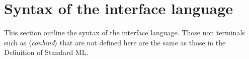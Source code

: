 \documentclass{jbook}
\newif\ifjp
\newcommand{\txt}[2]{#2}
\newcommand{\smlsharp}{SML\#}
\newcommand{\nonterm}[1]{\mbox{$\langle$}{\it #1}\mbox{$\rangle$}}
\begin{document}
\section{\txt{インタフェイス言語の文法}{Syntax of the interface language}}
\label{sec:tutorialInterfaceSyntax}

\ifjp%
	インタフェイス言語の文法の概要を以下に示します．
	\nonterm{conbind}などの定義が無い非終端記号は，The Definition of
Standard MLの同名のものと同一です．
	詳細な定義は
第\ref{part:referenceManual}部を参照ください．

\else%
	This section outline the syntax of the interface language.
	Those non terminals such as \nonterm{conbind} that are not
defined here are the same as those in the Definition of Standard ML.
\fi%
\end{document}
